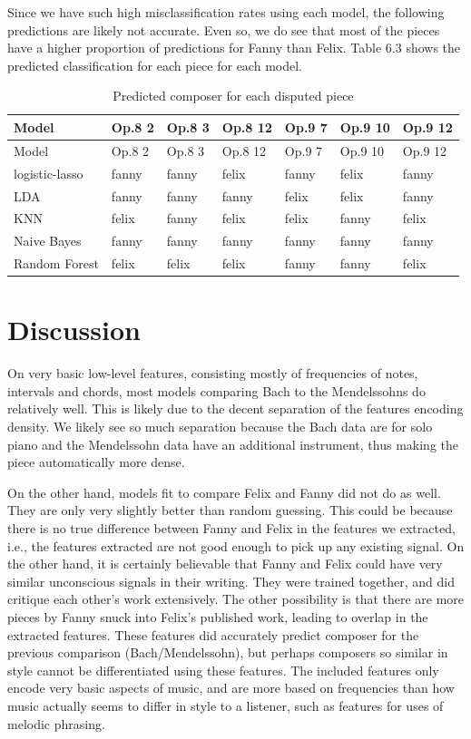 \documentclass[12pt,twoside]{reedthesis}
\theoremstyle{definition}
\theoremstyle{definition}
\theoremstyle{definition}
\theoremstyle{remark}
\begin{document}
Since we have such high misclassification rates using each model, the
following predictions are likely not accurate. Even so, we do see that
most of the pieces have a higher proportion of predictions for Fanny
than Felix. Table 6.3 shows the predicted classification for each piece
for each model.
\begin{longtable}[]{@{}lllllll@{}}
\caption{Predicted composer for each disputed piece}\tabularnewline
\toprule
Model & Op.8 2 & Op.8 3 & Op.8 12 & Op.9 7 & Op.9 10 & Op.9
12\tabularnewline
\midrule
\endfirsthead
\toprule
Model & Op.8 2 & Op.8 3 & Op.8 12 & Op.9 7 & Op.9 10 & Op.9
12\tabularnewline
\midrule
\endhead
logistic-lasso & fanny & fanny & felix & fanny & felix &
fanny\tabularnewline
LDA & fanny & fanny & fanny & felix & felix & fanny\tabularnewline
KNN & felix & fanny & felix & felix & fanny & felix\tabularnewline
Naive Bayes & fanny & fanny & fanny & fanny & fanny &
fanny\tabularnewline
Random Forest & felix & felix & felix & fanny & fanny &
felix\tabularnewline
\bottomrule
\end{longtable}
\section{Discussion}\label{discussion}

On very basic low-level features, consisting mostly of frequencies of
notes, intervals and chords, most models comparing Bach to the
Mendelssohns do relatively well. This is likely due to the decent
separation of the features encoding density. We likely see so much
separation because the Bach data are for solo piano and the Mendelssohn
data have an additional instrument, thus making the piece automatically
more dense.

On the other hand, models fit to compare Felix and Fanny did not do as
well. They are only very slightly better than random guessing. This
could be because there is no true difference between Fanny and Felix in
the features we extracted, i.e., the features extracted are not good
enough to pick up any existing signal. On the other hand, it is
certainly believable that Fanny and Felix could have very similar
unconscious signals in their writing. They were trained together, and
did critique each other's work extensively. The other possibility is
that there are more pieces by Fanny snuck into Felix's published work,
leading to overlap in the extracted features. These features did
accurately predict composer for the previous comparison
(Bach/Mendelssohn), but perhaps composers so similar in style cannot be
differentiated using these features. The included features only encode
very basic aspects of music, and are more based on frequencies than how
music actually seems to differ in style to a listener, such as features
for uses of melodic phrasing.
\end{document}
